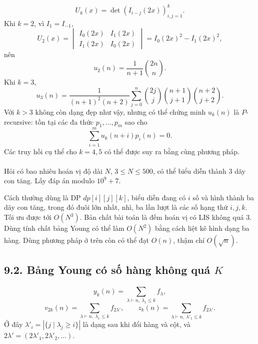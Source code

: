 \documentclass[11pt]{article}
\begin{document}
\paragraph{}
\[
U_k(x)=\det(I_{i-j}(2x))_{i,j=1}^k.
\]
Khi \(k=2\), vì \(I_1=I_{-1}\),
\[
U_2(x)=
\begin{vmatrix}
I_0(2x)&I_1(2x)\\
I_1(2x)&I_0(2x)
\end{vmatrix}
=I_0(2x)^2-I_1(2x)^2,
\]
nên
\[
u_2(n)=\frac1{n+1}\binom{2n}{n}.
\]
Khi \(k=3\),
\[
u_3(n)=
\frac1{(n+1)^2(n+2)}
\sum_{j=0}^n
\binom{2j}{j}\binom{n+1}{j+1}\binom{n+2}{j+2}.
\]
Với \(k>3\) không còn dạng đẹp như vậy, nhưng có thể chứng minh \(u_k(n)\) là
\(P\)-recursive: tồn tại các đa thức \(p_1,\ldots,p_m\) sao cho
\[
\sum_{i=1}^m u_k(n+i)p_i(n)=0.
\]
Các truy hồi cụ thể cho \(k=4,5\) có thể được suy ra bằng cùng phương pháp.

\paragraph{}
Hỏi có bao nhiêu hoán vị độ dài \(N\), \(3\le N\le500\), có thể biểu diễn
thành \(3\) dãy con tăng. Lấy đáp án modulo \(10^9+7\).

Cách thường dùng là DP \(dp[i][j][k]\), biểu diễn đang có \(i\) số và hình
thành ba dãy con tăng, trong đó đuôi lớn nhất, nhì, ba lần lượt là các số
hạng thứ \(i,j,k\). Tối ưu được tới \(O(N^3)\). Bản chất bài toán là đếm hoán
vị có LIS không quá \(3\). Dùng tính chất bảng Young có thể làm \(O(N^2)\) bằng
cách liệt kê hình dạng ba hàng. Dùng phương pháp ở trên còn có thể đạt
\(O(n)\), thậm chí \(O(\sqrt n)\).

\subsection*{9.2. Bảng Young có số hàng không quá \(K\)}

\paragraph{}
\[
y_k(n)=\sum_{\lambda\vdash n,\ \lambda_1\le k}f_\lambda,
\]
\[
v_{2k}(n)=\sum_{\lambda\vdash n,\ \lambda_1\le k} f_{2\lambda'} ,
\qquad
z_k(n)=\sum_{\lambda\vdash n,\ \lambda'_1\le k} f_{2\lambda'}.
\]
Ở đây \(\lambda'_i=|\{j\mid \lambda_j\ge i\}|\) là dạng sau khi đổi hàng và
cột, và \(2\lambda'=(2\lambda'_1,2\lambda'_2,\ldots)\).
\end{document}
